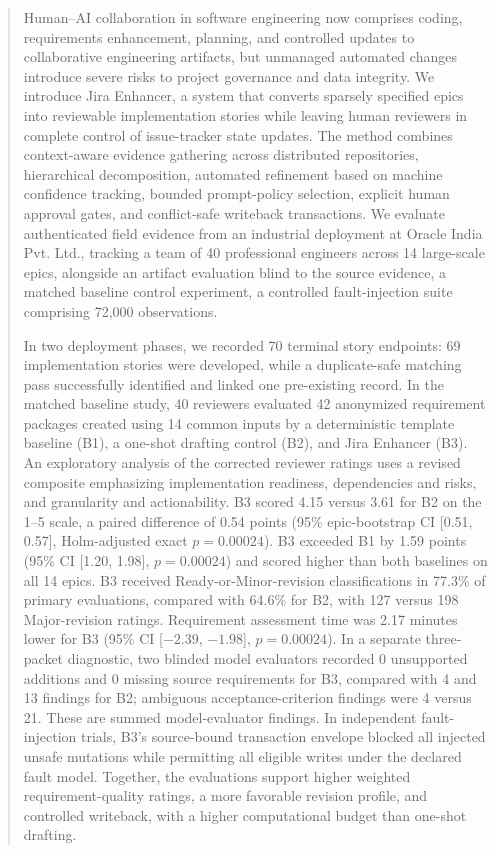 \documentclass[manuscript,review]{acmart}
\begin{document}
\begin{abstract}
Human–AI collaboration in software engineering now comprises coding, requirements enhancement, planning, and controlled updates to collaborative engineering artifacts, but unmanaged automated changes introduce severe risks to project governance and data integrity. We introduce Jira Enhancer, a system that converts sparsely specified epics into reviewable implementation stories while leaving human reviewers in complete control of issue-tracker state updates. The method combines context-aware evidence gathering across distributed repositories, hierarchical decomposition, automated refinement based on machine confidence tracking, bounded prompt-policy selection, explicit human approval gates, and conflict-safe writeback transactions. We evaluate authenticated field evidence from an industrial deployment at Oracle India Pvt. Ltd., tracking a team of 40 professional engineers across 14 large-scale epics, alongside an artifact evaluation blind to the source evidence, a matched baseline control experiment, a controlled fault-injection suite comprising 72,000 observations.

In two deployment phases, we recorded 70 terminal story endpoints: 69 implementation stories were developed, while a duplicate-safe matching pass successfully identified and linked one pre-existing record. In the matched baseline study, 40 reviewers evaluated 42 anonymized requirement packages created using 14 common inputs by a deterministic template baseline (B1), a one-shot drafting control (B2), and Jira Enhancer (B3). An exploratory analysis of the corrected reviewer ratings uses a revised composite emphasizing implementation readiness, dependencies and risks, and granularity and actionability. B3 scored 4.15 versus 3.61 for B2 on the 1--5 scale, a paired difference of 0.54 points (95\% epic-bootstrap CI [0.51, 0.57], Holm-adjusted exact $p=0.00024$). B3 exceeded B1 by 1.59 points (95\% CI [1.20, 1.98], $p=0.00024$) and scored higher than both baselines on all 14 epics. B3 received Ready-or-Minor-revision classifications in 77.3\% of primary evaluations, compared with 64.6\% for B2, with 127 versus 198 Major-revision ratings. Requirement assessment time was 2.17 minutes lower for B3 (95\% CI [$-2.39$, $-1.98$], $p=0.00024$). In a separate three-packet diagnostic, two blinded model evaluators recorded 0 unsupported additions and 0 missing source requirements for B3, compared with 4 and 13 findings for B2; ambiguous acceptance-criterion findings were 4 versus 21. These are summed model-evaluator findings. In independent fault-injection trials, B3's source-bound transaction envelope blocked all injected unsafe mutations while permitting all eligible writes under the declared fault model. Together, the evaluations support higher weighted requirement-quality ratings, a more favorable revision profile, and controlled writeback, with a higher computational budget than one-shot drafting.

\end{abstract}
\end{document}
